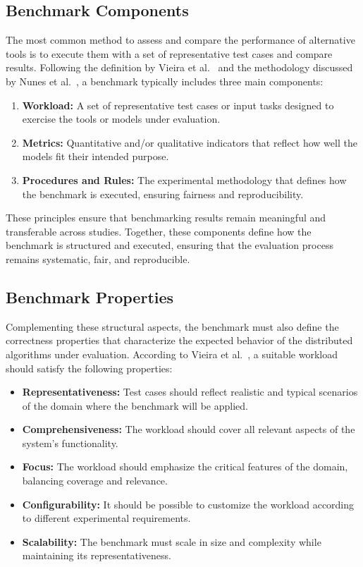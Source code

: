 \subsection{Benchmark Components}

The most common method to assess and compare the performance of alternative tools is to execute them with a set of representative test cases and compare results. 
Following the definition by Vieira et al.~\cite{vieira2012resilience} and the methodology discussed by Nunes et al.~\cite{nunes2018benchmarking}, a benchmark typically includes three main components:

\begin{enumerate}
    \item \textbf{Workload:} A set of representative test cases or input tasks designed to exercise the tools or models under evaluation.
    \item \textbf{Metrics:} Quantitative and/or qualitative indicators that reflect how well the models fit their intended purpose.
    \item \textbf{Procedures and Rules:} The experimental methodology that defines how the benchmark is executed, ensuring fairness and reproducibility.
\end{enumerate}

These principles ensure that benchmarking results remain meaningful and transferable across studies. Together, these components define how the benchmark is structured and executed, ensuring that the evaluation process remains systematic, fair, and reproducible.

\subsection{Benchmark Properties}
Complementing these structural aspects, the benchmark must also define the correctness properties that characterize the expected behavior of the distributed algorithms under evaluation.
According to Vieira et al.~\cite{vieira2012resilience}, a suitable workload should satisfy the following properties:
\begin{itemize}
    \item \textbf{Representativeness:} Test cases should reflect realistic and typical scenarios of the domain where the benchmark will be applied.
    \item \textbf{Comprehensiveness:} The workload should cover all relevant aspects of the system’s functionality.
    \item \textbf{Focus:} The workload should emphasize the critical features of the domain, balancing coverage and relevance.
    \item \textbf{Configurability:} It should be possible to customize the workload according to different experimental requirements.
    \item \textbf{Scalability:} The benchmark must scale in size and complexity while maintaining its representativeness.
\end{itemize}

